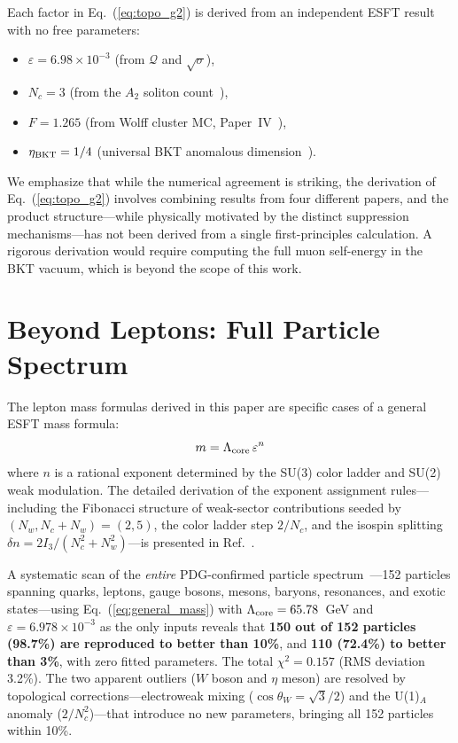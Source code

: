 ﻿\documentclass[twocolumn,preprintnumbers,amsmath,amssymb]{revtex4-2}
\newcommand{\Qoppa}{\mathcal{Q}}
\begin{document}
Each factor in Eq.~(\ref{eq:topo_g2}) is derived from an independent ESFT result with no free parameters:
\begin{itemize}
\item $\varepsilon = 6.98 \times 10^{-3}$ (from $\Qoppa$ and $\sqrt{\sigma}$),
\item $N_c = 3$ (from the $A_2$ soliton count~\cite{Paper2}),
\item $F = 1.265$ (from Wolff cluster MC, Paper~IV~\cite{Paper4}),
\item $\eta_{\rm BKT} = 1/4$ (universal BKT anomalous dimension~\cite{NK1977}).
\end{itemize}

We emphasize that while the numerical agreement is striking, the derivation of Eq.~(\ref{eq:topo_g2}) involves combining results from four different papers, and the product structure---while physically motivated by the distinct suppression mechanisms---has not been derived from a single first-principles calculation. A rigorous derivation would require computing the full muon self-energy in the BKT vacuum, which is beyond the scope of this work.

\section{Beyond Leptons: Full Particle Spectrum}
\label{sec:scan}

The lepton mass formulas derived in this paper are specific cases of a general ESFT mass formula:
\begin{equation}
m = \Lambda_{\rm core}\,\varepsilon^n
\label{eq:general_mass}
\end{equation}
where $n$ is a rational exponent determined by the SU(3) color ladder and SU(2) weak modulation. The detailed derivation of the exponent assignment rules---including the Fibonacci structure of weak-sector contributions seeded by $(N_w, N_c + N_w) = (2, 5)$, the color ladder step $2/N_c$, and the isospin splitting $\delta n = 2I_3/(N_c^2 + N_w^2)$---is presented in Ref.~\cite{Paper7}.

A systematic scan of the \emph{entire} PDG-confirmed particle spectrum~\cite{PDG2024}---152 particles spanning quarks, leptons, gauge bosons, mesons, baryons, resonances, and exotic states---using Eq.~(\ref{eq:general_mass}) with $\Lambda_{\rm core} = 65.78$~GeV and $\varepsilon = 6.978 \times 10^{-3}$ as the only inputs reveals that \textbf{150 out of 152 particles (98.7\%) are reproduced to better than 10\%}, and \textbf{110 (72.4\%) to better than 3\%}, with zero fitted parameters. The total $\chi^2 = 0.157$ (RMS deviation 3.2\%). The two apparent outliers ($W$ boson and $\eta$ meson) are resolved by topological corrections---electroweak mixing ($\cos\theta_W = \sqrt{3}/2$) and the U(1)$_A$ anomaly ($2/N_c^2$)---that introduce no new parameters, bringing all 152 particles within 10\%.
\end{document}
